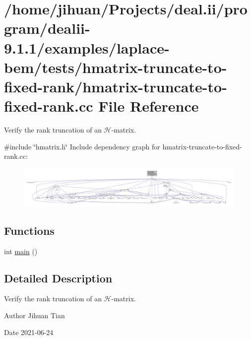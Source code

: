 \hypertarget{hmatrix-truncate-to-fixed-rank_8cc}{}\section{/home/jihuan/\+Projects/deal.ii/program/dealii-\/9.1.1/examples/laplace-\/bem/tests/hmatrix-\/truncate-\/to-\/fixed-\/rank/hmatrix-\/truncate-\/to-\/fixed-\/rank.cc File Reference}
\label{hmatrix-truncate-to-fixed-rank_8cc}


Verify the rank truncation of an $\mathcal{H}$-\/matrix.  


{\ttfamily \#include \char`\"{}hmatrix.\+h\char`\"{}}\newline
Include dependency graph for hmatrix-\/truncate-\/to-\/fixed-\/rank.cc\+:\nopagebreak
\begin{figure}[H]
\begin{center}
\leavevmode
\includegraphics[width=350pt]{hmatrix-truncate-to-fixed-rank_8cc__incl}
\end{center}
\end{figure}
\subsection*{Functions}
\begin{DoxyCompactItemize}
\item 
int \hyperlink{hmatrix-truncate-to-fixed-rank_8cc_ae66f6b31b5ad750f1fe042a706a4e3d4}{main} ()
\end{DoxyCompactItemize}


\subsection{Detailed Description}
Verify the rank truncation of an $\mathcal{H}$-\/matrix. 

\begin{DoxyAuthor}{Author}
Jihuan Tian 
\end{DoxyAuthor}
\begin{DoxyDate}{Date}
2021-\/06-\/24 
\end{DoxyDate}


